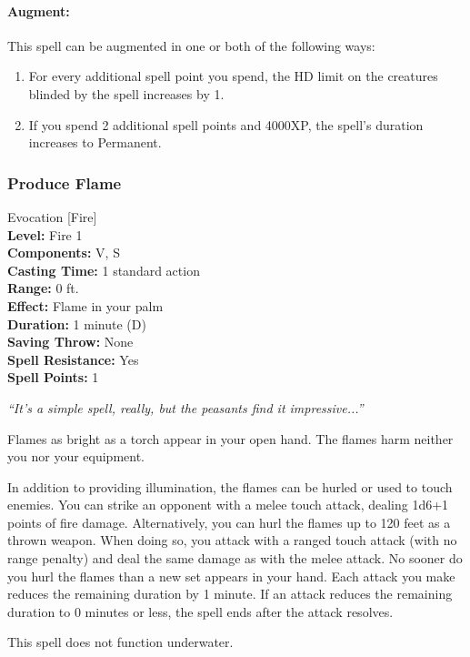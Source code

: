 \paragraph{Augment:} This spell can be augmented in one or both of the following ways:
\begin{enumerate}
 \item For every additional spell point you spend, the HD limit on the creatures blinded by the spell increases by 1.
 \item If you spend 2 additional spell points and 4000XP, the spell's duration increases to Permanent.
\end{enumerate}
\subsubsection{Produce Flame}
\label{Spell:ProduceFlame}
Evocation [Fire]
\\ \textbf{Level:} Fire 1
\\ \textbf{Components:} V, S
\\ \textbf{Casting Time:} 1 standard action
\\ \textbf{Range:} 0 ft.
\\ \textbf{Effect:} Flame in your palm
\\ \textbf{Duration:} 1 minute (D)
\\ \textbf{Saving Throw:} None
\\ \textbf{Spell Resistance:} Yes
\\ \textbf{Spell Points:} 1

\emph{``It's a simple spell, really, but the peasants find it impressive...''}

Flames as bright as a torch appear in your open hand. The flames harm neither you nor your equipment.

In addition to providing illumination, the flames can be hurled or used to touch enemies. 
You can strike an opponent with a melee touch attack, dealing  1d6+1 points of fire damage. 
Alternatively, you can hurl the flames up to 120 feet as a thrown weapon. 
When doing so, you attack with a ranged touch attack (with no range penalty) and deal the same damage as with the melee attack. 
No sooner do you hurl the flames than a new set appears in your hand. 
Each attack you make reduces the remaining duration by 1 minute. 
If an attack reduces the remaining duration to 0 minutes or less, the spell ends after the attack resolves.

This spell does not function underwater.

